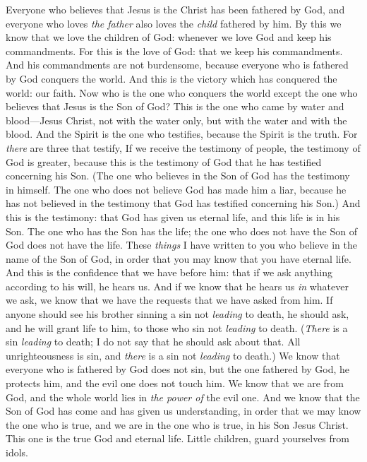 \begin{biblechapter} %
\verse Everyone who believes that Jesus is the Christ has been fathered by God, and everyone who loves \textit{the father} also loves the \textit{child} fathered by him.
\verse By this we know that we love the children of God: whenever we love God and keep his commandments.
\verse For this is the love of God: that we keep his commandments. And his commandments are not burdensome,
\verse because everyone who is fathered by God conquers the world.
 And this is the victory which has conquered the world: our faith.
\verse Now who is the one who conquers the world except the one who believes that Jesus is the Son of God?
\verse This is the one who came by water and blood—Jesus Christ, not with the water only, but with the water and with the blood. And the Spirit is the one who testifies, because the Spirit is the truth.
\verse For \textit{there} are three that testify,
\verse If we receive the testimony of people, the testimony of God is greater, because this is the testimony of God that he has testified concerning his Son.
\verse (The one who believes in the Son of God has the testimony in himself. The one who does not believe God has made him a liar, because he has not believed in the testimony that God has testified concerning his Son.)
\verse And this is the testimony: that God has given us eternal life, and this life is in his Son.
\verse The one who has the Son has the life; the one who does not have the Son of God does not have the life.
 These \textit{things} I have written to you who believe in the name of the Son of God, in order that you may know that you have eternal life.
\verse And this is the confidence that we have before him: that if we ask anything according to his will, he hears us.
\verse And if we know that he hears us \textit{in} whatever we ask, we know that we have the requests that we have asked from him.
\verse If anyone should see his brother sinning a sin not \textit{leading} to death, he should ask, and he will grant life to him, to those who sin not \textit{leading} to death. (\textit{There} is a sin \textit{leading} to death; I do not say that he should ask about that.
\verse All unrighteousness is sin, and \textit{there} is a sin not \textit{leading} to death.)
\verse We know that everyone who is fathered by God does not sin, but the one fathered by God, he protects him, and the evil one does not touch him.
\verse We know that we are from God, and the whole world lies in \textit{the power of} the evil one.
\verse And we know that the Son of God has come and has given us understanding, in order that we may know the one who is true, and we are in the one who is true, in his Son Jesus Christ. This one is the true God and eternal life.
\verse Little children, guard yourselves from idols.
\end{biblechapter}

